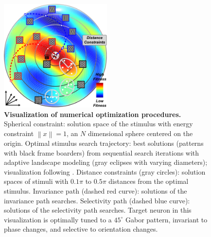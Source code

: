 \begin{figure}
\centering \includegraphics[width=0.5\textwidth]{Figs/methods.pdf} 
\caption{
{\bf Visualization of numerical optimization procedures.} Spherical constraint: solution space of the stimulus with energy constraint $\left\| x \right\| = 1$, an $N$ dimensional sphere centered on the origin. Optimal stimulus search trajectory: best solutions (patterns with black frame boarders) from sequential search iterations with adaptive landscape modeling (gray eclipses with varying diameters); visualization following \cite{muller2010black}. Distance constraints (gray circles): solution spaces of stimuli with $0.1\pi$ to $0.5\pi$ distances from the optimal stimulus. Invariance path (dashed red curve): solutions of the invariance path searches. Selectivity path (dashed blue curve): solutions of the selectivity path searches. Target neuron in this visualization is optimally tuned to a $45^{\circ}$ Gabor pattern, invariant to phase changes, and selective to orientation changes.}
\label{fig:methods}
\end{figure}

